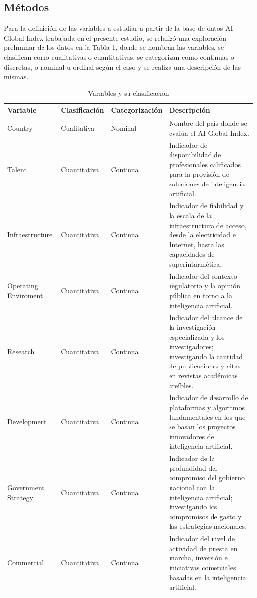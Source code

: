 \documentclass[
]{article}
\begin{document}
\begin{multicols}{2}
\section{Métodos}
Para la definición de las variables a estudiar a partir de la base de datos AI Global Index trabajada en el presente estudio, se relalizó una exploración preliminar de los datos en la Tabla 1, donde se nombran las variables, se clasifican como cualitativas o cuantitativas, se categorizan como continuas o discretas, o nominal u ordinal según el caso y se realiza una descripción de las mismas.

\end{multicols}

\renewcommand{\arraystretch}{1.5}
\begin{footnotesize}
\begin{longtable}[t]{lllp{8cm}}
\caption{\label{tab:tabla1}Variables y su clasificación}\\
\toprule
Variable & Clasificación & Categorización & Descripción\\
\midrule
Country & Cualitativa & Nominal & Nombre del país donde se evalúa el AI Global Index.\\
Talent & Cuantitativa & Continua & Indicador de disponibilidad de profesionales calificados para la provisión de soluciones de inteligencia artificial.\\
Infraestructure & Cuantitativa & Continua & Indicador de fiabilidad y la escala de la infraestructura de acceso, desde la electricidad e Internet, hasta las capacidades de superintarmética.\\
Operating Enviroment & Cuantitativa & Continua & Indicador del contexto regulatorio y la opinión pública en torno a la inteligencia artificial.\\
Research & Cuantitativa & Continua & Indicador del alcance de la investigación especializada y los investigadores; investigando la cantidad de publicaciones y citas en revistas académicas creíbles.\\
\addlinespace
Development & Cuantitativa & Continua & Indicador de desarrollo de plataformas y algoritmos fundamentales en los que se basan los proyectos innovadores de inteligencia artificial.\\
Government Strategy & Cuantitativa & Continua & Indicador de la profundidad del compromiso del gobierno nacional con la inteligencia artificial; investigando los compromisos de gasto y las estrategias nacionales.\\
Commercial & Cuantitativa & Continua & Indicador del nivel de actividad de puesta en marcha, inversión e iniciativas comerciales basadas en la inteligencia artificial.\\

\end{longtable}
\end{footnotesize}
\end{document}
